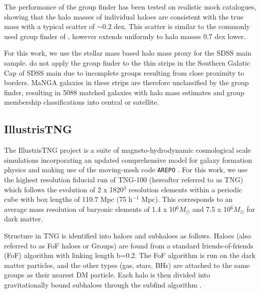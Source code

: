 \documentclass[fleqn,usenatbib]{mnras}
\begin{document}
The performance of the group finder has been tested on realistic mock catalogues, showing that the halo masses of individual haloes are consistent with the true mass with a typical scatter of $\sim$0.2 dex. This scatter is similar to the commonly used group finder of \citet{yang2007}, however extends uniformly to halo masses 0.7 dex lower. 

For this work, we use the stellar mass based halo mass proxy for the SDSS main sample. \citet{lim2017} do not apply the group finder to the thin strips in the Southern Galatic Cap of SDSS main due to incomplete groups resulting from close proximity to borders. MaNGA galaxies in these strips are therefore unclassified by the group finder, resulting in 5088 matched galaxies with halo mass estimates and group membership classifications into central or satellite.


\subsection{IllustrisTNG}
The IllustrisTNG project \citep{marinacci18,naiman18,nelson18,pillepich18b,springel18} is a suite of magneto-hydrodynamic cosmological scale simulations incorporating an updated comprehensive model for galaxy formation physics \citep[as decribed in; ][]{weinberger17,pillepich18a} and making use of the moving-mesh code \texttt{AREPO} \citep{springel10,pakmor11,pakmor13}. For this work, we use the highest resolution fiducial run of TNG-100 (hereafter referred to as TNG) which follows the evolution of 2 x 1820$^3$ resolution elements within a periodic cube with box lengths of 110.7 Mpc (75 h$^{-1}$ Mpc). This corresponds to an average mass resolution of baryonic elements of 1.4 x 10$^6 M_{\odot}$ and 7.5 x 10$^6 M_{\odot}$ for dark matter. 

Structure in TNG is identified into haloes and subhaloes as follows. Haloes (also referred to as FoF haloes or Groups) are found from a standard friends-of-friends (FoF) algorithm \citep{davis85} with linking length b=0.2. The FoF algorithm is run on the dark matter particles, and the other types (gas, stars, BHs) are attached to the same groups as their nearest DM particle. Each halo is then divided into gravitationally bound subhaloes through the subfind algorithm \citep{springel01}.
\end{document}
